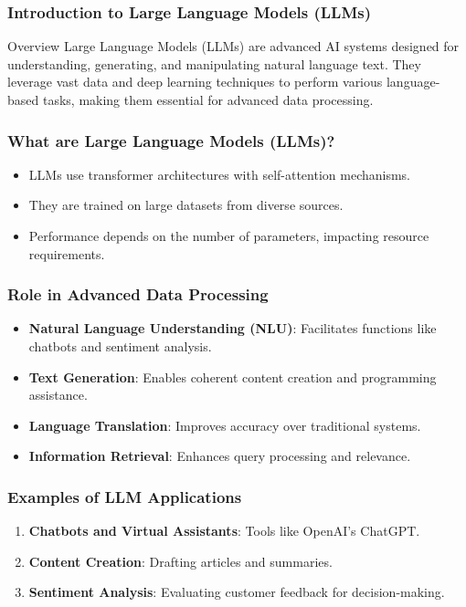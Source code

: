 \documentclass[aspectratio=169]{beamer}
\begin{document}
\begin{frame}[fragile]
    \frametitle{Introduction to Large Language Models (LLMs)}
    \begin{block}{Overview}
        Large Language Models (LLMs) are advanced AI systems designed for understanding, generating, and manipulating natural language text. They leverage vast data and deep learning techniques to perform various language-based tasks, making them essential for advanced data processing.
    \end{block}
\end{frame}

\begin{frame}[fragile]
    \frametitle{What are Large Language Models (LLMs)?}
    \begin{itemize}
        \item LLMs use transformer architectures with self-attention mechanisms.
        \item They are trained on large datasets from diverse sources.
        \item Performance depends on the number of parameters, impacting resource requirements.
    \end{itemize}
\end{frame}

\begin{frame}[fragile]
    \frametitle{Role in Advanced Data Processing}
    \begin{itemize}
        \item \textbf{Natural Language Understanding (NLU)}: Facilitates functions like chatbots and sentiment analysis.
        \item \textbf{Text Generation}: Enables coherent content creation and programming assistance.
        \item \textbf{Language Translation}: Improves accuracy over traditional systems.
        \item \textbf{Information Retrieval}: Enhances query processing and relevance.
    \end{itemize}
\end{frame}

\begin{frame}[fragile]
    \frametitle{Examples of LLM Applications}
    \begin{enumerate}
        \item \textbf{Chatbots and Virtual Assistants}: Tools like OpenAI's ChatGPT.
        \item \textbf{Content Creation}: Drafting articles and summaries.
        \item \textbf{Sentiment Analysis}: Evaluating customer feedback for decision-making.
    \end{enumerate}
\end{frame}
\end{document}
